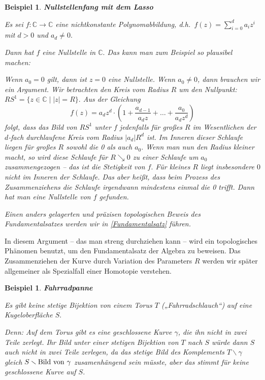 \documentclass[12pt]{book}   %
\newtheorem{bsp}[alles]{Beispiel}
\begin{document}
\begin{bsp} \label{Lasso}{\bf Nullstellenfang mit dem Lasso}

{\rm Es sei $f:\mathbb C\longrightarrow \mathbb C$ eine nichtkonstante 
Polynomabbildung, d.h.\ $f(z) = \sum_{i=0}^d a_iz^i$ mit $d>0$ und $a_d\neq 0.$

Dann hat $f$ eine Nullstelle in $\mathbb C.$ Das kann man zum Beispiel so 
plausibel machen:

Wenn $a_0=0$ gilt, dann ist $z=0$ eine Nullstelle. Wenn $a_0\neq 0$, dann 
brauchen wir ein Argument. Wir betrachten den Kreis vom Radius $R$ um den 
Nullpunkt: $RS^1 = \{z\in \mathbb C \mid |z|=R\}.$ Aus der Gleichung
$$f(z) = a_dz^d \cdot (1 + \frac{a_{d-1}}{a_d z} + \dots + 
\frac{a_{0}}{a_d z^d})$$ 
folgt, dass das Bild von $RS^1$ unter $f$ jedenfalls für großes $R$ im 
Wesentlichen der $d$-fach 
durchlaufene Kreis vom Radius $|a_d|R^d$ ist. Im Inneren dieser Schlaufe liegen
für großes $R$ sowohl die 0 als auch $a_0.$ Wenn man nun den Radius 
kleiner macht, so wird diese Schlaufe für $R\searrow 0$ zu einer Schlaufe um 
$a_0$
zusammengezogen -- das ist die Stetigkeit von $f.$ Für kleines $R$ liegt 
insbesondere $0$ nicht im Inneren der Schlaufe. Das aber heißt, dass beim
Prozess des Zusammenziehens die Schlaufe irgendwann mindestens einmal die 0
trifft. Dann hat man eine Nullstelle von $f$ gefunden.

Einen anders gelagerten und präzisen topologischen Beweis des 
Fundamentalsatzes werden wir in \ref{Fundamentalsatz} führen.
}
\end{bsp}

In diesem Argument -- das man streng durchziehen kann -- wird ein topologisches
Phänomen benutzt, um den Fundamentalsatz der Algebra zu beweisen. Das 
Zusammenziehen der Kurve durch Variation des Parameters $R$ werden wir später
allgemeiner als Spezialfall einer Homotopie verstehen.

\begin{bsp}{\bf Fahrradpanne}

{\rm Es gibt keine stetige Bijektion von einem Torus $T$ 
(„Fahrradschlauch“) auf eine Kugeloberfläche $S.$ 


Denn:  Auf dem Torus gibt es eine geschlossene Kurve $\gamma$, die ihn nicht 
in zwei 
Teile zerlegt. Ihr Bild unter einer stetigen Bijektion von $T$ nach $S$ 
würde dann $S$ auch nicht in zwei Teile zerlegen, da das stetige Bild des
Komplements $T\smallsetminus \gamma$ gleich 
$S\smallsetminus{\rm Bild\ von\ }\gamma$ zusamenhängend sein müsste, aber
das stimmt für keine geschlossene Kurve auf $S$.}
\end{bsp}
\end{document}
